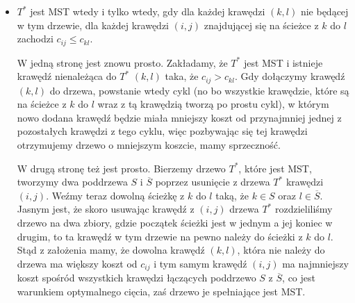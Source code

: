 \begin{itemize}
	\item $T^{\ast}$ jest MST wtedy i tylko wtedy, gdy dla każdej krawędzi $\left( k, l\right)$ nie będącej w tym drzewie, dla każdej krawędzi $\left( i, j \right)$ znajdującej się na ścieżce z $k$ do $l$ zachodzi $c_{ij} \leqslant c_{kl}$.
	
	W jedną stronę jest znowu prosto. Zakładamy, że $T^{\ast}$ jest MST i istnieje krawędź nienależąca do $T^{\ast}$ $\left( k, l \right)$ taka, że $c_{ij} > c_{kl}$. Gdy dołączymy krawędź $\left( k, l \right)$ do drzewa, powstanie wtedy cykl (no bo wszystkie krawędzie, które są na ścieżce z $k$ do $l$ wraz z tą krawędzią tworzą po prostu cykl), w którym nowo dodana krawędź będzie miała mniejszy koszt od przynajmniej jednej z pozostałych krawędzi z tego cyklu, więc pozbywając się tej krawędzi otrzymujemy drzewo o mniejszym koszcie, mamy sprzeczność.
	
	W drugą stronę też jest prosto. Bierzemy drzewo $T^{\ast}$, które jest MST, tworzymy dwa poddrzewa $S$ i $\overline{S}$ poprzez usunięcie z drzewa $T^{\ast}$ krawędzi $\left( i, j \right)$. Weźmy teraz dowolną ścieżkę z $k$ do $l$ taką, że $k \in S$ oraz $l \in \overline{S}$. Jasnym jest, że skoro usuwając krawędź z $\left( i, j \right)$ drzewa $T^{\ast}$ rozdzieliliśmy drzewo na dwa zbiory, gdzie początek ścieżki jest w jednym a jej koniec w drugim, to ta krawędź w tym drzewie na pewno należy do ścieżki z $k$ do $l$. Stąd z założenia mamy, że dowolna krawędź $\left( k, l \right)$, która nie należy do drzewa ma większy koszt od $c_{ij}$ i tym samym krawędź $\left( i, j \right)$ ma najmniejszy koszt spośród wszystkich krawędzi łączących poddrzewo $S$ z $\overline{S}$, co jest warunkiem optymalnego cięcia, zaś drzewo je spełniające jest MST.
\end{itemize}
